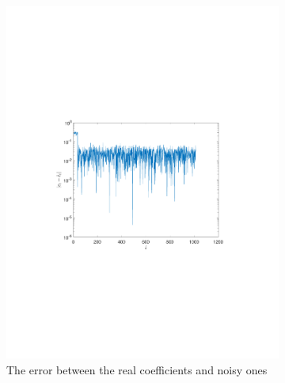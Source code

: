 \documentclass[a4paper]{article}
\begin{document}
\begin{figure}[H]
\begin{subfigure}{0.49\textwidth}
		\includegraphics[trim={4cm 8cm 4cm 8cm},clip,width=1\textwidth]{Images/CoeffDelta=0.pdf}
		\caption{The error between the real coefficients and noisy ones}
		\label{sub:ErrCoeffD=0}
	\end{subfigure}
	\begin{subfigure}{0.49\textwidth}
		\centering

\end{subfigure}
\end{figure}
\end{document}
